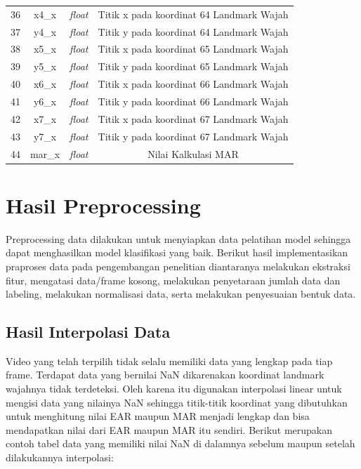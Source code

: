 \begin{longtable}{|c|c|c|c|}
  36          & x4\_x               & \textit{float}     & Titik x pada koordinat 64 Landmark Wajah \\
  37          & y4\_x               & \textit{float}     & Titik y pada koordinat 64 Landmark Wajah \\
  38          & x5\_x               & \textit{float}     & Titik x pada koordinat 65 Landmark Wajah \\
  39          & y5\_x               & \textit{float}     & Titik y pada koordinat 65 Landmark Wajah \\
  40          & x6\_x               & \textit{float}     & Titik x pada koordinat 66 Landmark Wajah \\
  41          & y6\_x               & \textit{float}     & Titik y pada koordinat 66 Landmark Wajah \\
  42          & x7\_x               & \textit{float}     & Titik x pada koordinat 67 Landmark Wajah \\
  43          & y7\_x               & \textit{float}     & Titik y pada koordinat 67 Landmark Wajah \\
  44          & mar\_x              & \textit{float}     & Nilai Kalkulasi MAR                      \\
  \hline
\end{longtable}

\section{Hasil Preprocessing}

Preprocessing data dilakukan untuk menyiapkan data pelatihan model sehingga dapat menghasilkan
model klasifikasi yang baik. Berikut hasil implementasikan praproses data pada pengembangan penelitian
diantaranya melakukan ekstraksi fitur, mengatasi data/frame kosong, melakukan penyetaraan jumlah data
dan labeling, melakukan normalisasi data, serta melakukan penyesuaian bentuk data.

\subsection{Hasil Interpolasi Data}
Video yang telah terpilih tidak selalu memiliki data yang lengkap pada tiap frame. Terdapat data yang
bernilai NaN dikarenakan koordinat landmark wajahnya tidak terdeteksi. Oleh karena itu digunakan interpolasi
linear untuk mengisi data yang nilainya NaN sehingga titik-titik koordinat yang dibutuhkan untuk menghitung
nilai EAR maupun MAR menjadi lengkap dan bisa mendapatkan nilai dari EAR maupun MAR itu sendiri. Berikut
merupakan contoh tabel data yang memiliki nilai NaN di dalamnya sebelum maupun setelah dilakukannya
interpolasi:

